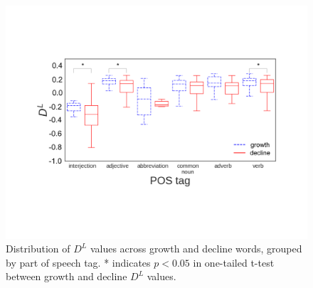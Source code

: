 

\begin{figure}
\centering
\includegraphics[width=\columnwidth]{figures/growth_vs_decline_matched_pos_DL_distribution_1_12.pdf}
\caption{Distribution of $D^{L}$ values across growth and decline words, grouped by part of speech tag. 
* indicates $p<0.05$ in one-tailed t-test between growth and decline $D^{L}$ values.}
\label{fig:success_vs_failure_pos_DL_distribution}
\end{figure}

